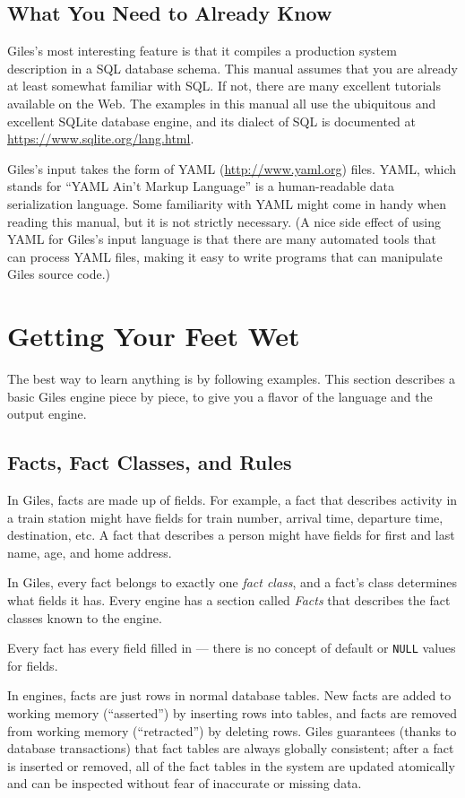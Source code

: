 \documentclass[letterpaper,10pt]{article}
\begin{document}
\subsection{What You Need to Already Know}
Giles's most interesting feature is that it compiles a production system description in a SQL database schema.
This manual assumes that you are already at least somewhat familiar with SQL.
If not, there are many excellent tutorials available on the Web.
The examples in this manual all use the ubiquitous and excellent SQLite database engine, and its dialect of SQL is documented at \url{https://www.sqlite.org/lang.html}.

Giles's input takes the form of YAML (\url{http://www.yaml.org}) files.
YAML, which stands for ``YAML Ain't Markup Language'' is a human-readable data serialization language.
Some familiarity with YAML might come in handy when reading this manual, but it is not strictly necessary.
(A nice side effect of using YAML for Giles's input language is that there are many automated tools that can process YAML files, making it easy to write programs that can manipulate Giles source code.)

\section{Getting Your Feet Wet}
The best way to learn anything is by following examples.
This section describes a basic Giles engine piece by piece, to give you a flavor of the language and the output engine.

\subsection{Facts, Fact Classes, and Rules}
In Giles, facts are made up of fields.
For example, a fact that describes activity in a train station might have fields for train number, arrival time, departure time, destination, etc.
A fact that describes a person might have fields for first and last name, age, and home address.

In Giles, every fact belongs to exactly one \emph{fact class}, and a fact's class determines what fields it has.
Every engine has a section called \emph{Facts} that describes the fact classes known to the engine.

Every fact has every field filled in --- there is no concept of default or \texttt{NULL} values for fields.

In engines, facts are just rows in normal database tables.
New facts are added to working memory (``asserted'') by inserting rows into tables, and facts are removed from working memory (``retracted'') by deleting rows.
Giles guarantees (thanks to database transactions) that fact tables are always globally consistent; after a fact is inserted or removed, all of the fact tables in the system are updated atomically and can be inspected without fear of inaccurate or missing data.
\end{document}
